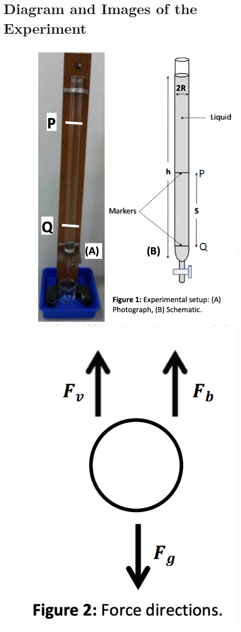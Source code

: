 \documentclass[11pt, a4paper, abstract=true]{scrartcl}
\begin{document}
\section{Diagram and Images of the Experiment}
\begin{figure}[H]
    \begin{minipage}{0.48\textwidth}
      \centering
      \includegraphics[width=.85\linewidth]{Apparatus.png}
    \end{minipage}\hfill
    \begin{minipage}{0.48\textwidth}
      \centering
      \includegraphics[width=.8\linewidth]{Force.png}

\end{minipage}
\end{figure}
\end{document}
